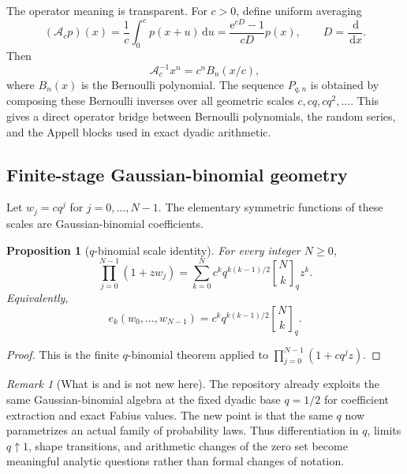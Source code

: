 \documentclass[11pt]{article}
\numberwithin{equation}{section}
\newtheorem{proposition}[theorem]{Proposition}
\theoremstyle{definition}
\theoremstyle{remark}
\newtheorem{remark}[theorem]{Remark}
\newcommand{\dd}{\,\mathrm d}
\newcommand{\e}{\mathrm e}
\newcommand{\qbinom}[3]{\genfrac{[}{]}{0pt}{}{#1}{#2}_{#3}}
\begin{document}
The operator meaning is transparent.  For $c>0$, define uniform averaging
\[
 (\mathcal A_cp)(x)=\frac1c\int_0^c p(x+u)\dd u
 =\frac{\e^{cD}-1}{cD}p(x),
 \qquad D=\frac{\dd}{\dd x}.
\]
Then
\begin{equation}
 \mathcal A_c^{-1}x^n=c^nB_n(x/c),                           \label{p10:eq:bernoulli-inverse}
\end{equation}
where $B_n(x)$ is the Bernoulli polynomial.  The sequence $P_{q,n}$ is obtained by composing
these Bernoulli inverses over all geometric scales $c,cq,cq^2,\ldots$.  This gives a direct
operator bridge between Bernoulli polynomials, the random series, and the Appell blocks used
in exact dyadic arithmetic.

\subsection{Finite-stage Gaussian-binomial geometry}

Let $w_j=cq^j$ for $j=0,\ldots,N-1$.  The elementary symmetric functions of these scales are
Gaussian-binomial coefficients.

\begin{proposition}[$q$-binomial scale identity]
\label{p10:prop:qbinomial}
For every integer $N\ge0$,
\begin{equation}
 \prod_{j=0}^{N-1}(1+zw_j)
 =\sum_{k=0}^{N}c^kq^{k(k-1)/2}\qbinom{N}{k}{q}z^k.          \label{p10:eq:q-binomial-scales}
\end{equation}
Equivalently,
\begin{equation}
 e_k(w_0,\ldots,w_{N-1})
 =c^kq^{k(k-1)/2}\qbinom{N}{k}{q}.                           \label{p10:eq:elementary-scales}
\end{equation}
\end{proposition}

\begin{proof}
This is the finite $q$-binomial theorem applied to
$\prod_{j=0}^{N-1}(1+cq^jz)$.
\end{proof}

\begin{remark}[What is and is not new here]
The repository already exploits the same Gaussian-binomial algebra at the fixed dyadic base
$q=1/2$ for coefficient extraction and exact Fabius values.  The new point is that the same
$q$ now parametrizes an actual family of probability laws.  Thus differentiation in $q$,
limits $q\uparrow1$, shape transitions, and arithmetic changes of the zero set become
meaningful analytic questions rather than formal changes of notation.
\end{remark}
\end{document}

